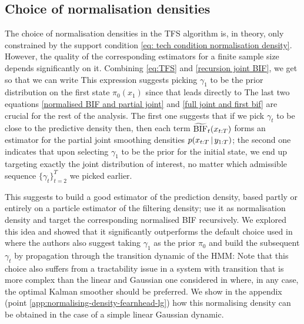 \subsection{Choice of normalisation densities}
The choice of normalisation densities in the TFS algorithm is, in theory, only constrained by the support condition \eqref{eq: tech condition normalisation density}. However, the quality of the corresponding estimators for a finite sample size depends significantly on it. 
Combining \eqref{eq:TFS} and \eqref{recursion joint BIF}, we get
%
%
so that we can write
%
%
This expression suggests picking $\gamma_{1}$ to be the prior distribution on the first state $\pi_{0}(x_{1})$ since that leads directly to 
%
%
The last two equations \eqref{normalised BIF and partial joint} and \eqref{full joint and first bif} are crucial for the rest of the analysis. The first one suggests that if we pick $\gamma_{t}$ to be close to the predictive density then, then each term $\widetilde{\text{BIF}}_{t}(x_{t:T})$ forms an estimator for the partial joint smoothing densities $p(x_{t:T}\,|\, y_{1:T})$; the second one indicates that upon selecting $\gamma_{1}$ to be the prior for the initial state, we end up targeting exactly the joint distribution of interest, no matter which admissible sequence $\{\gamma_{t}\}_{t=2}^{T}$ we picked earlier. 

This suggests to build a good estimator of the prediction density, based partly or entirely on a particle estimator of the filtering density; use it as normalisation density and target the corresponding normalised BIF recursively. 
We explored this idea and showed that it significantly outperforms the default choice used in \citep{briers10, fearnhead10} where the authors also suggest taking $\gamma_{1}$ as the prior $\pi_{0}$ and build the subsequent $\gamma_{t}$ by propagation through the transition dynamic of the HMM:
%
%
Note that this choice also suffers from a tractability issue in a system with transition that is more complex than the linear and Gaussian one considered in \citep{fearnhead10} where, in any case, the optimal Kalman smoother should be preferred. We show in the appendix (point \ref{app:normalising-density-fearnhead-lg}) how this normalising density can be obtained in the case of a simple linear Gaussian dynamic.

